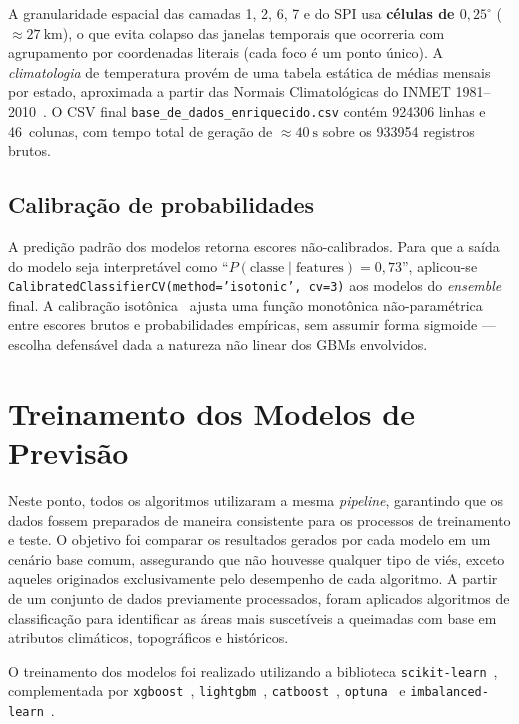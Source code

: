 A granularidade espacial das camadas 1, 2, 6, 7 e do SPI usa \textbf{células de \(0{,}25^\circ\)} (\(\approx \SI{27}{\km}\)), o que evita colapso das janelas temporais que ocorreria com agrupamento por coordenadas literais (cada foco é um ponto único). A \emph{climatologia} de temperatura provém de uma tabela estática de médias mensais por estado, aproximada a partir das Normais Climatológicas do INMET 1981--2010~\cite{inmetnormais}. O CSV final \texttt{base\_de\_dados\_enriquecido.csv} contém \num{924306} linhas e 46~colunas, com tempo total de geração de \(\approx \SI{40}{\second}\) sobre os \num{933954} registros brutos.

\subsection{Calibração de probabilidades}
\label{subsec:metod_calibracao}

A predição padrão dos modelos retorna escores não-calibrados. Para que a saída do modelo seja interpretável como ``\(P(\text{classe} \mid \text{features}) = 0{,}73\)'', aplicou-se \texttt{CalibratedClassifierCV(method='isotonic', cv=3)} aos modelos do \emph{ensemble} final. A calibração isotônica~\cite{zadrozny2002transforming} ajusta uma função monotônica não-paramétrica entre escores brutos e probabilidades empíricas, sem assumir forma sigmoide --- escolha defensável dada a natureza não linear dos GBMs envolvidos.

\section{Treinamento dos Modelos de Previsão}
\label{sec:metod_treinamento}

Neste ponto, todos os algoritmos utilizaram a mesma \emph{pipeline}, garantindo que os dados fossem preparados de maneira consistente para os processos de treinamento e teste. O objetivo foi comparar os resultados gerados por cada modelo em um cenário base comum, assegurando que não houvesse qualquer tipo de viés, exceto aqueles originados exclusivamente pelo desempenho de cada algoritmo. A partir de um conjunto de dados previamente processados, foram aplicados algoritmos de classificação para identificar as áreas mais suscetíveis a queimadas com base em atributos climáticos, topográficos e históricos.

O treinamento dos modelos foi realizado utilizando a biblioteca \texttt{scikit-learn}~\cite{pedregosa2011scikit}, complementada por \texttt{xgboost}~\cite{chen2016xgboost}, \texttt{lightgbm}~\cite{ke2017lightgbm}, \texttt{catboost}~\cite{prokhorenkova2018catboost}, \texttt{optuna}~\cite{akiba2019optuna} e \texttt{imbalanced-learn}~\cite{lemaitre2017imbalanced}.


